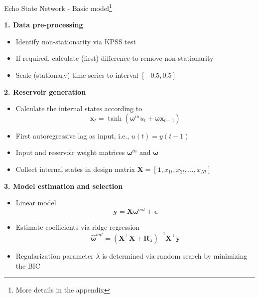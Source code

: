 \documentclass[aspectratio=169]{beamer}
\begin{document}
\begin{frame}[t]{Echo State Network - Basic model\footnote{More details in the appendix}}
    \begin{minipage}[t]{0.33\textwidth}
        \vspace{0pt}
        \textbf{1. Data pre-processing}
        \begin{itemize}
            \item Identify non-stationarity via KPSS test
			\item If required, calculate (first) difference to remove non-stationarity
			\item Scale (stationary) time series to interval $[-0.5, 0.5]$
        \end{itemize}
    \end{minipage}%
    \hfill
    \begin{minipage}[t]{0.33\textwidth}
        \vspace{0pt}
        \textbf{2. Reservoir generation}
        \begin{itemize}
            \item Calculate the internal states according to
				\begin{equation*}
					\mathbf{x}_{t} = \tanh \left( {\boldsymbol{\omega}^{in}} u_{t} + \boldsymbol{\omega} \mathbf{x}_{t-1} \right)
				\end{equation*}
			\item First autoregressive lag as input, i.e., $u(t) = y(t-1)$
			\item Input and reservoir weight matrices $\boldsymbol{\omega}^{in}$ and $\boldsymbol{\omega}$
			\item Collect internal states in design matrix $\mathbf{X} = [\mathbf{1},  x_{1t}, x_{2t}, ..., x_{Nt}]$
        \end{itemize}
    \end{minipage}
    \hfill
    \begin{minipage}[t]{0.33\textwidth}
        \vspace{0pt}
        \textbf{3. Model estimation and selection}
        \begin{itemize}
            \item Linear model
            	\begin{equation*}
            	\mathbf{y} = \mathbf{X} \boldsymbol{\omega}^{out} + \boldsymbol{\epsilon}
				\end{equation*}
			\item Estimate coefficients via ridge regression
				\begin{equation*}
				\boldsymbol{\hat{\omega}}^{out} = (\mathbf{X}^\top \mathbf{X} + \mathbf{R}_{\lambda})^{-1}\mathbf{X}^\top\mathbf{y}
				\end{equation*}
			\item Regularization parameter $\lambda$ is determined via random search by minimizing the BIC
        \end{itemize}
    \end{minipage}
\end{frame}
\end{document}
